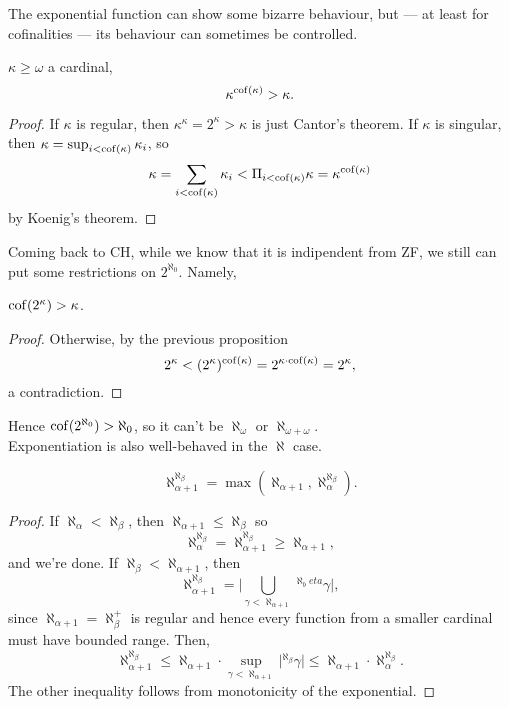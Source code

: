 \documentclass[twoside,openright,titlepage,numbers=noenddot,%
               headinclude,footinclude,cleardoublepage=empty,abstract=on,
               BCOR=23mm,paper=letter,fontsize=11pt
               ]{scrreprt}
\begin{document}
The exponential function can show some bizarre behaviour, but --- at least for cofinalities --- its behaviour can sometimes be controlled.
\begin{proposition}
    $\kappa \geq \omega$ a cardinal,
    \[ \kappa^{\mathrm{cof}(\kappa)} > \kappa. \]
\end{proposition}
\begin{proof}
    If $\kappa$ is regular, then $\kappa^\kappa = 2^\kappa > \kappa$ is just Cantor's theorem. If $\kappa$ is singular, then $\kappa = \sup_{i < \mathrm{cof}(\kappa)} \kappa_i$, so
    \[ \kappa = \sum_{i < \mathrm{cof}(\kappa)} \kappa_i < \Pi_{i < \mathrm{cof}(\kappa)} \kappa = \kappa^{\mathrm{cof}(\kappa)} \]
    by Koenig's theorem.
\end{proof}
Coming back to CH, while we know that it is indipendent from ZF, we still can put some restrictions on $2^{\aleph_0}$. Namely,
\begin{proposition}
    $\mathrm{cof}(2^\kappa) > \kappa$.
\end{proposition}
\begin{proof}
    Otherwise, by the previous proposition
    \[ 2^\kappa < (2^\kappa)^{\mathrm{cof}(\kappa)} = 2^{\kappa \cdot \mathrm{cof}(\kappa)} = 2^{\kappa}, \]
    a contradiction.
\end{proof}
Hence $\mathrm{cof}(2^{\aleph_0}) > \aleph_0$, so it can't be $\aleph_{\omega}$ or $\aleph_{\omega + \omega}$. \\
Exponentiation is also well-behaved in the $\aleph$ case.
\begin{theorem}
    \[ \aleph_{\alpha +1}^{\aleph_\beta} = \max(\aleph_{\alpha+1}, \aleph_{\alpha}^{\aleph_\beta}). \]
\end{theorem}
\begin{proof}
    If $\aleph_{\alpha} < \aleph_{\beta}$, then $\aleph_{\alpha+1} \leq \aleph_{\beta}$ so
    \[ \aleph_{\alpha}^{\aleph_{\beta}} = \aleph_{\alpha+1}^{\aleph_\beta} \geq \aleph_{\alpha+1}, \]
    and we're done. If $\aleph_{\beta} < \aleph_{\alpha+1}$, then
    \[ \aleph_{\alpha+1}^{\aleph_\beta} = \vert \bigcup_{\gamma < \aleph_{\alpha+1}} {}^{\aleph_beta} \gamma \vert, \]
    since $\aleph_{\alpha+1} = \aleph_{\beta}^+$ is regular and hence every function from a smaller cardinal must have bounded range. Then,
    \[ \aleph_{\alpha+1}^{\aleph_\beta} \leq \aleph_{\alpha+1} \cdot \sup_{\gamma < \aleph_{\alpha+1}} \vert {}^{\aleph_\beta} \gamma \vert \leq \aleph_{\alpha+1} \cdot \aleph_{\alpha}^{\aleph_\beta}. \]
    The other inequality follows from monotonicity of the exponential.
\end{proof}
\end{document}
